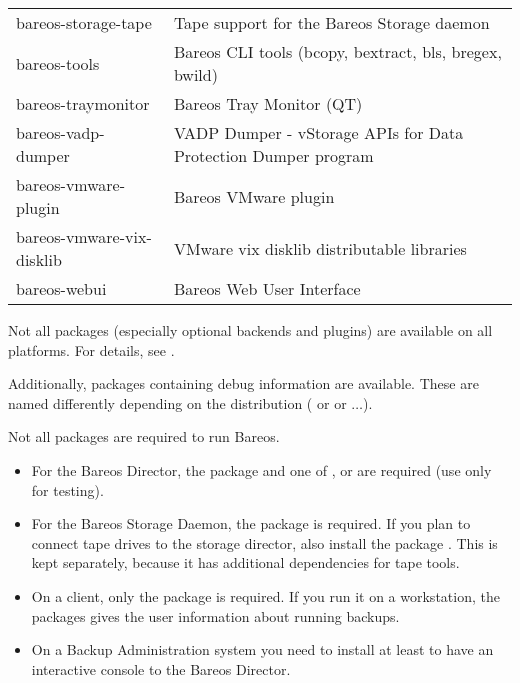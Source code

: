 \begin{center}
\begin{tabular}{ | l | l | }
bareos-storage-tape & Tape support for the Bareos Storage daemon \\
bareos-tools & Bareos CLI tools (bcopy, bextract, bls, bregex, bwild) \\
bareos-traymonitor & Bareos Tray Monitor (QT) \\
bareos-vadp-dumper & VADP Dumper - vStorage APIs for Data Protection Dumper program \\
bareos-vmware-plugin & Bareos VMware plugin \\
bareos-vmware-vix-disklib & VMware vix disklib distributable libraries \\
bareos-webui & Bareos Web User Interface \\
\hline
\end{tabular}
\end{center}

Not all packages (especially optional backends and plugins) are available on all platforms.
For details, see .

Additionally, packages containing debug information are available.
These are named differently depending on the distribution ( or  or  $\ldots$).

Not all packages are required to run Bareos.

\begin{itemize}
    \item For the Bareos Director, the package  and one of ,  or  are required (use  only for testing).

    \item For the Bareos Storage Daemon, the package  is required. If you plan to connect tape drives to the storage director, also install the package . This is kept separately, because it has additional dependencies  for tape tools.

    \item On a client, only the package  is required. If you run it on a workstation, the packages  gives the user information about running backups.

    \item On a Backup Administration system you need to install at least  to have an interactive console to the Bareos Director.

\end{itemize}



